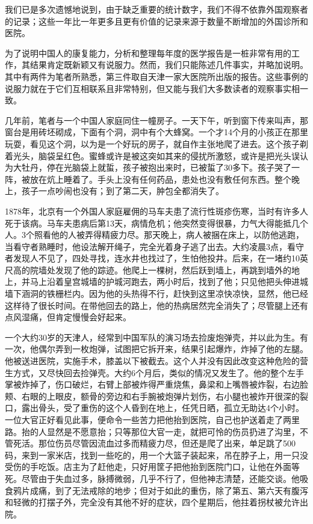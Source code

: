 \documentclass[12pt,oneside]{book}
\begin{document}
\begin{common-format}
我们已是多次遗憾地说到，由于缺乏重要的统计数字，我们不得不依靠外国观察者的记录；这些一年比一年更多且更有价值的记录来源于数量不断增加的外国诊所和医院。 

为了说明中国人的康复能力，分析和整理每年度的医学报告是一桩非常有用的工作，其结果肯定既新颖又有说服力。然而，我们只能陈述几件事实，并略加说明。其中有两件为笔者所熟悉，第三件取自天津一家大医院所出版的报告。这些事例的说服力就在于它们互相联系且非常特别，但又能与我们大多数读者的观察事实相一致。 

几年前，笔者与一个中国人家庭同住一幢房子。一天下午，听到窗下传来叫声，那窗台是用砖坯砌成，下面有个洞，洞中有个大蜂窝。一个才14个月的小孩正在那里玩耍，看见这个洞，以为是一个好玩的房子，就自作主张地爬了进去。这个孩子剃着光头，脑袋呈红色。蜜蜂或许是被这突如其来的侵扰所激怒，或许是把光头误认为大牡丹，停在光脑袋上就蜇，孩子被抱出来时，已被蜇了30多下。孩子哭了一阵，被放在炕上睡着了。手头上没有任何药品，患处也没有敷任何东西。整个晚上，孩子一点吵闹也没有；到了第二天，肿包全都消失了。 

1878年，北京有一个外国人家庭雇佣的马车夫患了流行性斑疹伤寒，当时有许多人死于该病。马车夫患病后第13天，病情危机；他突然变得很暴，力气大得能抵几个人。3个照看他的人被弄得精疲力尽。那天晚上，病人被捆在床上，以防他逃跑，当看守者熟睡时，他设法解开绳子，完全光着身子逃了出去。大约凌晨3点，看守者发现人不见了，四处寻找，连水井也找过了，生怕他投井。后来，在一堵约10英尺高的院墙处发现了他的踪迹。他爬上一棵树，然后跃到墙上，再跳到墙外的地上，并马上沿着皇宫城墙的护城河跑去，两小时后，找到了他；只见他把头伸进城墙下涵洞的铁栅栏内。因为他的头热得不行，赶快到这里凉快凉快，显然，他已经这样待了很长时间。在带他回去的路上，他的热病居然完全消失了；尽管腿上还有点风湿痛，但肯定慢慢会好起来。 

一个大约30岁的天津人，经常到中国军队的演习场去捡废炮弹壳，并以此为生。有一次，他偶尔弄到一枚炮弹，试图把它拆开来，结果引起爆炸，炸掉了他的左腿。他被送进医院，实施手术，膝盖以下被截去。这个人并没有因此改变这种危险的营生方式，又尽快回去捡弹壳。大约6个月后，类似的情况又发生了。他的整个左手掌被炸掉了，伤口破烂，右臂上部被炸得严重烧焦，鼻梁和上嘴唇被炸裂，右边脸颊、右眼的上眼皮，额骨的旁边和右手腕被炮弹片划伤，右小腿也被炸开很深的裂口，露出骨头，受了重伤的这个人昏到在地上，任凭日晒，孤立无助达4个小时。一位大官正好看见此事，便命令一些苦力把他抬到医院，自己也护送着走了两里路。抬的人显然是不愿意抬；只等那位大官一走，就把可怜的伤员扔进了沟里，不管死活。那位伤员尽管因流血过多而精疲力尽，但还是爬了出来，单足跳了500码，来到一家米店，找到一些吃的，用一个大篮子装起来，吊在脖子上，用一只没受伤的手吃饭。店主为了赶他走，只好用筐子把他抬到医院门口，让他在外面等死。尽管由于失血过多，脉搏微弱，几乎不行了，但他神志清楚，还能交谈。他吸食鸦片成痛，到了无法戒除的地步；但对于如此的重伤，除了第五、第六天有腹泻和轻微的打摆子外，完全没有其他不好的症状，四个星期后，他拄着拐杖被允许出院。 


\end{common-format}
\end{document}
